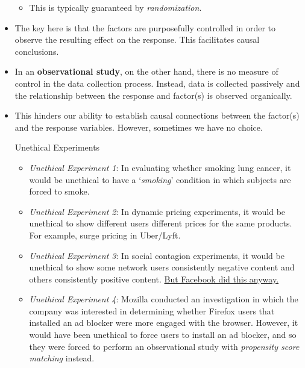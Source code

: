 \begin{itemize}
\begin{itemize}
              \item This is typically guaranteed by \emph{randomization}.
          \end{itemize}
    \item The key here is that the factors are purposefully controlled in order to
          observe the resulting effect on the response. This facilitates causal conclusions.
    \item In an \textbf{observational study}, on the other hand, there is no measure of control
          in the data collection process. Instead, data is collected passively and
          the relationship between the response and factor(s) is observed organically.
    \item This hinders our ability to establish causal connections between the factor(s)
          and the response variables. However, sometimes we have no choice.
          \begin{Example}{Unethical Experiments}{}
              \begin{itemize}
                  \item \emph{Unethical Experiment 1}: In evaluating whether smoking lung cancer,
                        it would be unethical to have a `\emph{smoking}' condition in which subjects are
                        forced to smoke.
                  \item \emph{Unethical Experiment 2}: In dynamic pricing experiments, it would be unethical
                        to show different users different prices for the same products. For example, surge pricing
                        in Uber/Lyft.
                  \item \emph{Unethical Experiment 3}: In social contagion experiments, it would be unethical
                        to show some network users consistently negative content and others consistently positive content.
                        \href{https://slate.com/technology/2014/06/facebook-unethical-experiment-it-made-news-feeds-happier-or-sadder-to-manipulate-peoples-emotions.html}{But Facebook did this anyway.}
                  \item \emph{Unethical Experiment 4}: Mozilla conducted an investigation in which
                        the company was interested in determining whether Firefox users that installed an ad blocker
                        were more engaged with the browser. However, it would have been unethical to force users to install
                        an ad blocker, and so they were forced to perform an observational study with \emph{propensity score matching}
                        instead.
              \end{itemize}
          \end{Example}
\end{itemize}
